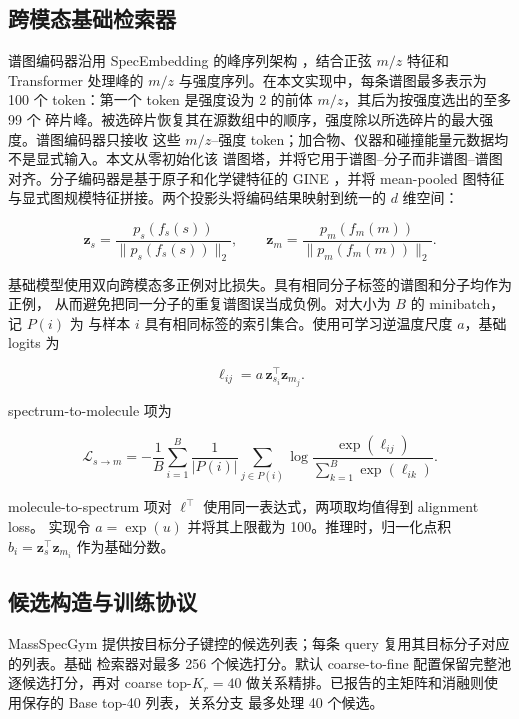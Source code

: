 \documentclass[UTF8,11pt]{ctexart}
\newcommand{\zs}{\mathbf{z}_s}
\newcommand{\zm}{\mathbf{z}_m}
\begin{document}
\subsection{跨模态基础检索器}

谱图编码器沿用 SpecEmbedding 的峰序列架构 \cite{xiong2025specembedding}，结合正弦
$m/z$ 特征和 Transformer 处理峰的 $m/z$ 与强度序列。在本文实现中，每条谱图最多表示为
100 个 token：第一个 token 是强度设为 2 的前体 $m/z$，其后为按强度选出的至多 99 个
碎片峰。被选碎片恢复其在源数组中的顺序，强度除以所选碎片的最大强度。谱图编码器只接收
这些 $m/z$--强度 token；加合物、仪器和碰撞能量元数据均不是显式输入。本文从零初始化该
谱图塔，并将它用于谱图--分子而非谱图--谱图对齐。分子编码器是基于原子和化学键特征的 GINE
\cite{hu2020pretraininggnn}，并将
mean-pooled 图特征与显式图规模特征拼接。两个投影头将编码结果映射到统一的 $d$ 维空间：

\begin{equation}
  \zs=\frac{p_s(f_s(s))}{\lVert p_s(f_s(s))\rVert_2},
  \qquad
  \zm=\frac{p_m(f_m(m))}{\lVert p_m(f_m(m))\rVert_2}.
\end{equation}

基础模型使用双向跨模态多正例对比损失。具有相同分子标签的谱图和分子均作为正例，
从而避免把同一分子的重复谱图误当成负例。对大小为 $B$ 的 minibatch，记 $P(i)$ 为
与样本 $i$ 具有相同标签的索引集合。使用可学习逆温度尺度 $a$，基础 logits 为

\begin{equation}
  \ell_{ij}=a\,\mathbf{z}_{s_i}^{\top}\mathbf{z}_{m_j}.
\end{equation}

spectrum-to-molecule 项为

\begin{equation}
  \mathcal{L}_{s\rightarrow m}
  =-\frac{1}{B}\sum_{i=1}^{B}\frac{1}{|P(i)|}
  \sum_{j\in P(i)}
  \log\frac{\exp(\ell_{ij})}{\sum_{k=1}^{B}\exp(\ell_{ik})}.
\end{equation}

molecule-to-spectrum 项对 $\ell^\top$ 使用同一表达式，两项取均值得到 alignment loss。
实现令 $a=\exp(u)$ 并将其上限截为 100。推理时，归一化点积
$b_i=\zs^\top\mathbf{z}_{m_i}$ 作为基础分数。

\subsection{候选构造与训练协议}

MassSpecGym 提供按目标分子键控的候选列表；每条 query 复用其目标分子对应的列表。基础
检索器对最多 256 个候选打分。默认 coarse-to-fine 配置保留完整池逐候选打分，再对 coarse
top-$K_r=40$ 做关系精排。已报告的主矩阵和消融则使用保存的 Base top-40 列表，关系分支
最多处理 40 个候选。
\end{document}
